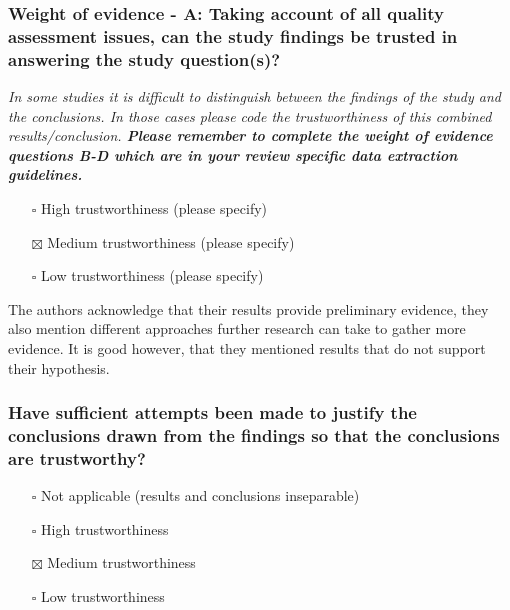\documentclass[
  doc, a4paper]{apa7}
\providecommand{\tightlist}{%
  \setlength{\itemsep}{0pt}\setlength{\parskip}{0pt}}
\begin{document}
\subsubsection{Weight of evidence - A: Taking account of all quality assessment issues, can the study findings be trusted in answering the study question(s)?}\label{weight-of-evidence---a-taking-account-of-all-quality-assessment-issues-can-the-study-findings-be-trusted-in-answering-the-study-questions}

\emph{In some studies it is difficult to distinguish between the findings of the study and the conclusions. In those cases please code the trustworthiness of this combined results/conclusion.\textbf{ Please remember to complete the weight of evidence questions B-D which are in your review specific data extraction guidelines. }}

\begin{itemize}
\tightlist
\item[$\square$]
  High trustworthiness (please specify)
\item[$\boxtimes$]
  Medium trustworthiness (please specify)
\item[$\square$]
  Low trustworthiness (please specify)
\end{itemize}

The authors acknowledge that their results provide preliminary evidence, they also mention different approaches further research can take to gather more evidence. It is good however, that they mentioned results that do not support their hypothesis.

\subsubsection{Have sufficient attempts been made to justify the conclusions drawn from the findings so that the conclusions are trustworthy?}\label{have-sufficient-attempts-been-made-to-justify-the-conclusions-drawn-from-the-findings-so-that-the-conclusions-are-trustworthy}

\begin{itemize}
\tightlist
\item[$\square$]
  Not applicable (results and conclusions inseparable)
\item[$\square$]
  High trustworthiness
\item[$\boxtimes$]
  Medium trustworthiness
\item[$\square$]
  Low trustworthiness
\end{itemize}
\end{document}
